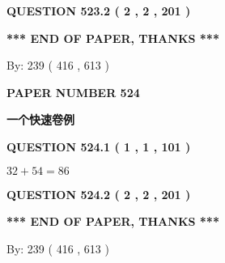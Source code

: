 \documentclass{ctexart}
\begin{document}
{\textbf{\Large{QUESTION
523.2 
 ( 2 , 2 , 201 )
}}}
  
  
   
   
 \vspace{0.2in}
 
   
   
   
   
\vspace{1.0in} 
{\textbf{\large{ *** END OF PAPER, THANKS *** }}} 
   
   
\hspace{1.0in} By: 
 239 ( 416 ,  613 )
   
   
   
   
\newpage 
\setcounter{page}{ 
   524001 } 
   
   
   
   
 {\textbf{ \Large{ PAPER NUMBER  524  }}}
   
   
\vspace{0.2in}
   
   
   
   
   
   
 \vspace{0.2in}
{\LARGE {\textbf{ 一个快速卷例}}}
   
   
  
\vspace{0.2in}
  
{\textbf{\Large{QUESTION
524.1 
 ( 1 , 1 , 101 )
}}}
  
  
 
 

$ %
32 +  %
54=   %
86$
 
 
  
\vspace{0.2in}
  
{\textbf{\Large{QUESTION
524.2 
 ( 2 , 2 , 201 )
}}}
  
  
   
   
 \vspace{0.2in}
 
   
   
   
   
\vspace{1.0in} 
{\textbf{\large{ *** END OF PAPER, THANKS *** }}} 
   
   
\hspace{1.0in} By: 
 239 ( 416 ,  613 )
   
   
   
   
\newpage 
\setcounter{page}{ 
   525001 } 
   
\end{document}
